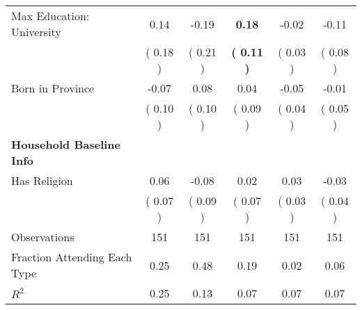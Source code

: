\begin{table}[H]
{\begin{tabular}{lccccc}
\quad Max Education: University &      0.14 &     -0.19 & \textbf{     0.18} &     -0.02 &     -0.11 \\
\quad  & (     0.18 ) & (     0.21 )  & \textbf{(     0.11 )}  & (     0.03 ) & (     0.08 ) \\
\quad Born in Province &     -0.07 &      0.08 &      0.04 &     -0.05 &     -0.01 \\
\quad  & (     0.10 ) & (     0.10 )  & (     0.09 )  & (     0.04 ) & (     0.05 ) \\
\midrule
\textbf{Household Baseline Info} \\
\quad Has Religion &      0.06 &     -0.08 &      0.02 &      0.03 &     -0.03 \\
\quad  & (     0.07 ) & (     0.09 )  & (     0.07 )  & (     0.03 ) & (     0.04 ) \\
\midrule
Observations & 151 & 151 & 151 & 151 & 151 \\
Fraction Attending Each Type &      0.25 &      0.48 &      0.19 &      0.02 &      0.06 \\
\midrule
$ R^2$ &      0.25 &      0.13 &      0.07 &      0.07 &      0.07 \\
\bottomrule
\end{tabular}}
\end{table}
